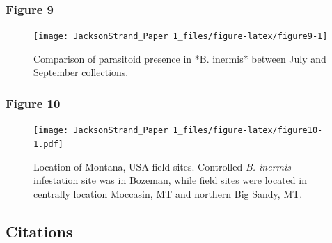 \documentclass[
]{article}
\begin{document}
\subsubsection{Figure 9}\label{figure9}

\begin{figure}

\texttt{[image: JacksonStrand\_Paper 1\_files/figure-latex/figure9-1]} \hfill{}

\caption{Comparison of parasitoid presence in *B. inermis* between July and September collections.}\label{fig:figure9}
\end{figure}

\subsubsection{Figure 10}\label{figurex}

\begin{figure}
\centering
\texttt{[image: JacksonStrand\_Paper 1\_files/figure-latex/figure10-1.pdf]}
\caption{Location of Montana, USA field sites. Controlled \emph{B.
inermis} infestation site was in Bozeman, while field sites were located
in centrally location Moccasin, MT and northern Big Sandy, MT.}
\end{figure}

\subsection*{Citations}\label{citations}
\end{document}
